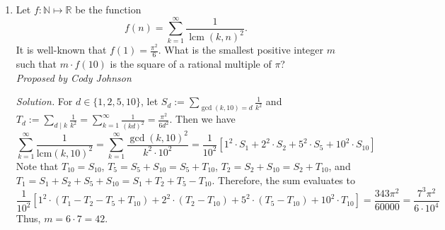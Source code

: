 \documentclass[10pt]{article}
\newcommand{\proposed}[1]
{
\vspace{5pt}
\noindent\textit{Proposed by #1}
}
\newcommand{\solution}
{
\vspace{5pt}
\noindent\textit{Solution.}\qquad
}
\begin{document}
\begin{enumerate}
	\solution Multiplying both sides of the equation by $ab$ yields 
	\[
		a^{2} + b^{2} = n(a+b).
	\]
	Now, $a^{2} + b^{2} \equiv 0 \pmod{a+b}$, and so $ab \equiv 0
	\pmod{a+b}$, and also $a^{2} \equiv 0 \pmod{a+b}$. Now, let $d =
	\gcd(a,b)$ so that $a = d a', b = db'$, with $a', b'$ relatively prime.
	Then, $a+b | a^{2}$ is equivalent to $a'+b' | d(a')^{2}$. However,
	$a'+b'$ cannot divide $(a')^{2}$, and thus $a'+b' | d$. Finally,
	\[
		n = \frac{a^{2} + b^{2}}{a+b} = \frac{d}{a'+b'} ((a')^{2} +
		(b')^{2}).
	\]
	In particular, $\dfrac{d}{a'+b'}$ must be an integer, and so it follows
	that $n$ is any multiple of a sum of relatively prime squares. It is
	well-known that any prime dividing a sum of squares must be $1
	\pmod{4}$, and so $n$ need only have a prime factor that is $1
	\pmod{4}$. The primes that satisfy this less than 50 are $5, 13, 17, 29,
	37, 41$, and they contribute $10, 3, 2, 1,1,1$ possible $n$
	respectively. Thus, the total possible number of $n$ is $\boxed{18}$.


\item Let $f:\mathbb{N}\mapsto\mathbb{R}$ be the function
	\[f(n)=\sum_{k=1}^\infty\dfrac{1}{\operatorname{lcm}(k,n)^2}.\] It is
	well-known that $f(1)=\tfrac{\pi^2}6$.  What is the smallest positive
	integer $m$ such that $m\cdot f(10)$ is the square of a rational
	multiple of $\pi$? \\%

	\proposed{Cody Johnson}

	\solution For $d\in\{1,2,5,10\}$, let $S_d:=\displaystyle\sum_{\gcd(k,10)=d}\frac1{k^2}$ and $T_d:=\displaystyle\sum_{d\mid k}\frac1{k^2}=\sum_{k=1}^\infty\frac1{(kd)^2}=\frac{\pi^2}{6d^2}$. Then we have
	\[\sum_{k=1}^\infty\frac1{\text{lcm}(k,10)^2}=\sum_{k=1}^\infty\frac{\gcd(k,10)^2}{k^2\cdot10^2}=\frac1{10^2}\left[1^2\cdot S_1+2^2\cdot S_2+5^2\cdot S_5+10^2\cdot S_{10}\right]\]
	Note that $T_{10}=S_{10}$, $T_5=S_5+S_{10}=S_5+T_{10}$, $T_2=S_2+S_{10}=S_2+T_{10}$, and $T_1=S_1+S_2+S_5+S_{10}=S_1+T_2+T_5-T_{10}$. Therefore, the sum evaluates to
	\[\frac1{10^2}\left[1^2\cdot(T_1-T_2-T_5+T_{10})+2^2\cdot(T_2-T_{10})+5^2\cdot(T_5-T_{10})+10^2\cdot T_{10}\right]=\frac{343\pi^2}{60000}=\frac{7^3\pi^2}{6\cdot10^4}\]
	Thus, $m=6\cdot7=\boxed{42}$.
	
\end{enumerate}
\end{document}
